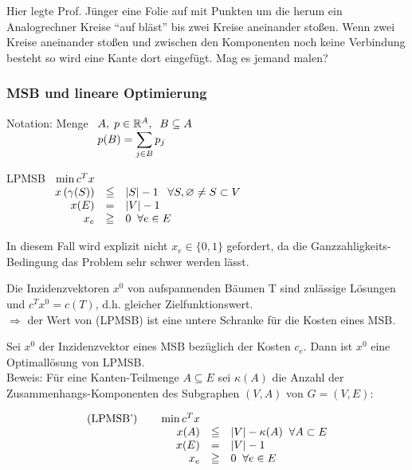 Hier legte Prof. Jünger eine Folie auf mit Punkten um die herum ein
Analogrechner Kreise "`auf bläst"' bis zwei Kreise aneinander stoßen. Wenn
zwei Kreise aneinander stoßen und zwischen den Komponenten noch keine
Verbindung besteht so wird eine Kante dort eingefügt. Mag es jemand malen?

\subsubsection{MSB und lineare Optimierung}

Notation: Menge $\begin{array}[t]{l} A, \; p \in \mathbb{R}^{A}, \; \; B \subseteq A\\
p(B) = \displaystyle \sum_{j \in B} p_{j}
\end{array}$

LPMSB $\begin{array}[t]{rcl} \min c^{T}x\\
x \left(\gamma(S)\right) &\leqq& |S| -1 \; \; \; \forall S, \varnothing \not=
S \subset V\\
x(E) &=& |V| -1\\
x_{e} &\geqq& 0 \; \; \forall e \in E
\end{array}$

In diesem Fall wird explizit nicht $x_{e} \in \{0,1\}$ gefordert, da die
Ganzzahligkeits-Bedingung das Problem sehr schwer werden lässt.

Die Inzidenzvektoren $x^{0}$ von aufspannenden Bäumen T sind zulässige
Lösungen und $c^{T}x^{0} = c(T) $, d.h. gleicher Zielfunktionswert.\\
$\Rightarrow$ der Wert von (LPMSB) ist eine untere Schranke für die Kosten
eines MSB.

\begin{satz}
Sei $x^{0}$ der Inzidenzvektor eines MSB bezüglich der Kosten $c_{e}$. Dann
ist $x^{0}$ eine Optimallösung von LPMSB.\\
Beweis: Für eine Kanten-Teilmenge $A \subseteq E$ sei $\kappa(A)$ die Anzahl
der Zusammenhangs-Komponenten des Subgraphen $(V,A)$ von $G=(V,E)$:

\[\begin{array}{rcl}
\mbox{(LPMSB')} \hspace{7mm} \min c^{T}x\\
x(A) &\leqq & |V| - \kappa(A) \; \; \forall A \subset E\\
x(E) &=& |V| -1\\
x_{e} &\geqq& 0 \; \; \forall e \in E
\end{array}\]
\end{satz}

